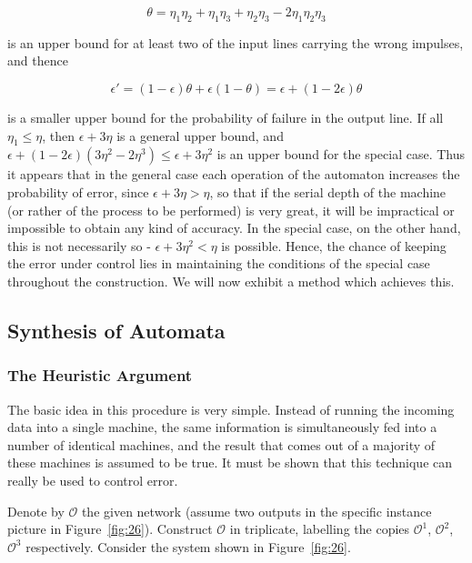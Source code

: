 \documentclass[twocolumn,preprintnumbers,amsmath,amssymb,floatfix]{revtex4}
\begin{document}
\begin{equation*}
\theta=\eta_1\eta_2+\eta_1\eta_3+\eta_2\eta_3-2\eta_1\eta_2\eta_3
\end{equation*}

\noindent is an upper bound for at least two of the input lines
carrying the wrong impulses, and thence

\begin{equation*}
\epsilon'=(1-\epsilon)\theta+\epsilon(1-\theta)=\epsilon+(1-2\epsilon)\theta
\end{equation*}

\noindent is a smaller upper bound for the probability of failure
in the output line. If all $\eta_1\leq\eta$, then $\epsilon+3\eta$
is a general upper bound, and
$\epsilon+(1-2\epsilon)(3\eta^2-2\eta^3)\leq \epsilon+3\eta^2$ is
an upper bound for the special case. Thus it appears that in the
general case each operation of the automaton increases the
probability of error, since $\epsilon+3\eta>\eta$, so that if the
serial depth of the machine (or rather of the process to be
performed) is very great, it will be impractical or impossible to
obtain any kind of accuracy. In the special case, on the other
hand, this is not necessarily so - $\epsilon+3\eta^2<\eta$ is
possible. Hence, the chance of keeping the error under control
lies in maintaining the conditions of the special case throughout
the construction. We will now exhibit a method which achieves
this.

\subsection{\label{sec:eight3}Synthesis of Automata}

\subsubsection{\label{sec:eight3_1}The Heuristic Argument} The
basic idea in this procedure is very simple. Instead of running
the incoming data into a single machine, the same information is
simultaneously fed into a number of identical machines, and the
result that comes out of a majority of these machines is assumed
to be true. It must be shown that this technique can really be
used to control error.

Denote by $\mathcal{O}$ the given network (assume two outputs in
the specific instance picture in Figure~\ref{fig:26}). Construct
$\mathcal{O}$ in triplicate, labelling the copies $\mathcal{O}^1$,
$\mathcal{O}^2$, $\mathcal{O}^3$ respectively. Consider the system
shown in Figure~\ref{fig:26}.
\end{document}
